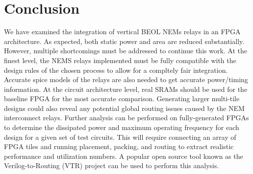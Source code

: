 \documentclass[twoside,twocolumn]{article}
\begin{document}
\section{Conclusion}
We have examined the integration of vertical BEOL NEMs relays in an FPGA architecture. 
As expected, both static power and area are reduced substantially. However, 
multiple shortcomings must be addressed to continue this work. At the finest level,
the NEMS relays implemented must be fully compatible with the design rules of the chosen process 
to allow for a compltely fair integration. Accurate spice models of the relays are also needed 
to get accurate power/timing information. At the circuit architecture level,
real SRAMs should be used for the baseline FPGA for the most accurate comparison. 
Generating larger multi-tile designs could also reveal any potential global 
routing issues caused by the NEM interconnect relays.
Further analysis can be performed on fully-generated FPGAs to determine the dissipated power and maximum 
operating frequency for each design for a given set of test circuits. 
This will require connecting an array of FPGA tiles and running 
placement, packing, and routing to extract realistic performance and
utilization numbers. A popular open source tool known as the Verilog-to-Routing 
(VTR) project \cite{vtr8} can be used to perform this analysis.  



\printbibliography

\end{document}

